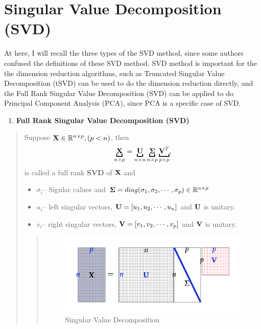 \documentclass[letterpaper,11pt,english]{sphinxmanual}
\begin{document}

\section{Singular Value Decomposition (SVD)}
\label{dim:index-1}\label{dim:singular-value-decomposition-svd}
At here, I will recall the three types of the SVD method, since some authors confused
the definitions of these SVD method. SVD method is important for the the dimension reduction
algorithms, such as Truncated Singular Value Decomposition (tSVD) can be used to do the dimension
reduction directly, and the Full Rank Singular Value Decomposition (SVD) can be applied to do Principal Component Analysis (PCA), since PCA is a specific case of SVD.
\begin{enumerate}
\item {} 
\textbf{Full Rank Singular Value Decomposition (SVD)}

\end{enumerate}
\begin{quote}

Suppose \({\bf X}\in\mathbb{R}^{n\times p}, (p<n)\), then
\label{dim:equation-svd}\begin{gather}
\begin{split}    \underbracket{\bf X}_{n\times p} =\underbracket{\bf U}_{n\times n} \underbracket{\bf\Sigma}_{n\times p} \underbracket{{\bf V}^T}_{p\times p},\end{split}\label{dim-svd}
\end{gather}
is called a full rank \textbf{SVD} of \({\bf X}\) and
\begin{itemize}
\item {} 
\(\sigma_i\)-- Sigular calues and \({\bf\Sigma}=diag(\sigma_1,\sigma_2, \cdots, \sigma_p)\in \mathbb{R}^{n\times p}\)

\item {} 
\(u_i\)-- left singular vectors, \({\bf U}=[u_1,u_2, \cdots, u_n]\) and  \({\bf U}\) is unitary.

\item {} 
\(v_i\)-- right singular vectors, \({\bf V}=[v_1,v_2, \cdots, v_p]\) and  \({\bf V}\) is unitary.

\end{itemize}
\begin{quote}
\begin{figure}[htbp]
\centering
\capstart

\includegraphics{svd.png}
\caption{Singular Value Decomposition}\label{dim:fig-svd}\end{figure}
\end{quote}
\end{quote}
\end{document}
